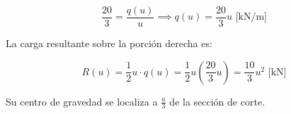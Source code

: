 \begin{equation}

    \frac{20}{3} = \frac{q(u)}{u} \implies q(u) = \frac{20}{3}u\text{ [kN/m]}

\end{equation}

La carga resultante sobre la porción derecha es:

\begin{equation}

    R(u) = \frac{1}{2} u \cdot q(u) = \frac{1}{2} u \left(\frac{20}{3}u\right) = \frac{10}{3}u^2\text{ [kN]}

\end{equation}

Su centro de gravedad se localiza a $\frac{u}{3}$ de la sección de corte.



